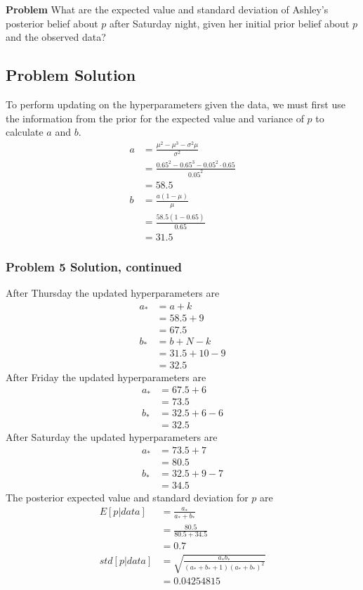 \documentclass[12pt]{article}
\theoremstyle{definition}
\begin{document}
\bigskip
\noindent
{\bf Problem} What are the expected value and standard deviation of Ashley's posterior belief about $p$ after Saturday night, given her initial prior belief about $p$ and the observed data?




\subsection*{Problem Solution}

To perform updating on the hyperparameters given the data, we must first use the information from the prior for the expected value and variance of $p$ to calculate $a$ and $b$.
\begin{align*}
a &= \frac{\mu^2 - \mu^3 - \sigma^2 \mu}{\sigma^2}\\
&= \frac{0.65^2 - 0.65^3 -  0.05^2 \cdot 0.65}{0.05^2}\\
&= 58.5\\
b &= \frac{a(1 - \mu)}{\mu}\\
&= \frac{58.5(1-0.65)}{0.65}\\
&= 31.5
\end{align*}\newpage
\subsubsection*{Problem 5 Solution, continued}

After Thursday the updated hyperparameters are
\begin{align*}
a_* &= a + k\\
&= 58.5 + 9\\
&= 67.5\\
b_* &= b + N - k\\
&= 31.5 + 10 - 9\\
&= 32.5
\end{align*}
After Friday the updated hyperparameters are
\begin{align*}
a_* &= 67.5 + 6\\
&= 73.5\\
b_* &= 32.5 + 6 - 6\\
&= 32.5
\end{align*}
After Saturday the updated hyperparameters are
\begin{align*}
a_* &= 73.5 + 7\\
&= 80.5\\
b_* &= 32.5 + 9 - 7\\
&= 34.5
\end{align*}
The posterior expected value and standard deviation for $p$ are
\begin{align*}
E[p|data] &= \frac{a_*}{a_* + b_*}\\
&= \frac{80.5}{80.5 + 34.5}\\
&= 0.7\\
std[p|data] &= \sqrt{\frac{a_* b_*}{(a_* + b_* + 1)(a_* + b_*)^2}}\\
&= 0.04254815
\end{align*}
\newpage
\end{document}
